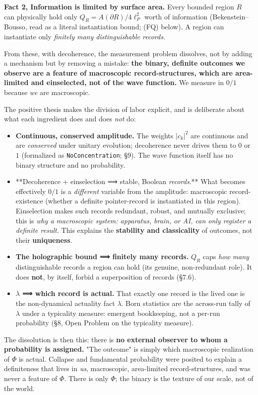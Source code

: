 \documentclass[11pt,a4paper]{article}
\begin{document}
\textbf{Fact 2, Information is limited by surface area.} Every bounded region $R$ can physically hold only $Q_R = A(\partial R)/4\ell_P^2$ worth of information (Bekenstein–Bousso, read as a literal instantiation bound; (FQ) below). A region can instantiate only \emph{finitely many distinguishable records.}

From these, with decoherence, the measurement problem dissolves, not by adding a mechanism but by removing a mistake: \textbf{the binary, definite outcomes we observe are a feature of macroscopic record-structures, which are area-limited and einselected, not of the wave function.} We measure in $0/1$ because \emph{we} are macroscopic.

The positive thesis makes the division of labor explicit, and is deliberate about what each ingredient does and does \emph{not} do:

\begin{itemize}
  \item \textbf{Continuous, conserved amplitude.} The weights $|c_k|^2$ are continuous and are \emph{conserved} under unitary evolution; decoherence never drives them to $0$ or $1$ (formalized as \texttt{NoConcentration}; §9). The wave function itself has no binary structure and no probability.
  \item **Decoherence + einselection ⟹ stable, Boolean \emph{records}.** What becomes effectively $0/1$ is a \emph{different} variable from the amplitude: macroscopic record-existence (whether a definite pointer-record is instantiated in this region). Einselection makes such records redundant, robust, and mutually exclusive; this is \emph{why a macroscopic system: apparatus, brain, or AI, can only register a definite result.} This explains the \textbf{stability and classicality} of outcomes, not their \textbf{uniqueness}.
  \item \textbf{The holographic bound ⟹ finitely many records.} $Q_R$ caps \emph{how many} distinguishable records a region can hold (its genuine, non-redundant role). It does \textbf{not}, by itself, forbid a superposition of records (§7.6).
  \item \textbf{$\lambda$ ⟹ which record is actual.} That exactly one record is the lived one is the non-dynamical actuality fact $\lambda$. Born statistics are the across-run tally of $\lambda$ under a typicality measure: emergent bookkeeping, not a per-run probability (§8, Open Problem on the typicality measure).
\end{itemize}

The dissolution is then this: there is \textbf{no external observer to whom a probability is assigned.} "The outcome" is simply which macroscopic realization of $\Phi$ is actual. Collapse and fundamental probability were posited to explain a definiteness that lives in \emph{us}, macroscopic, area-limited record-structures, and was never a feature of $\Phi$. There is only $\Phi$; the binary is the texture of our scale, not of the world.
\end{document}
